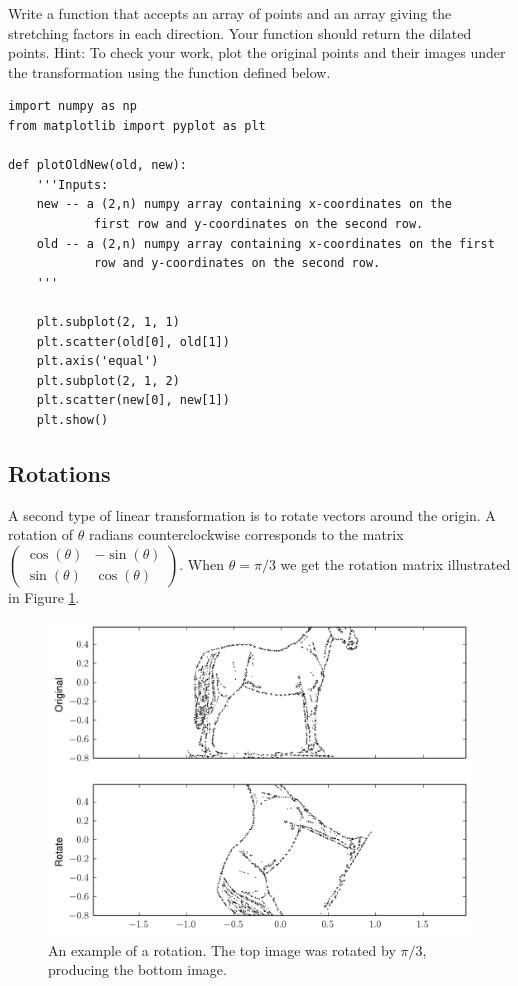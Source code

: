\begin{problem}\label{prob:dilation}
Write a function that accepts an array of points and an array giving the stretching factors in each direction. 
Your function should return the dilated points. 
Hint: To check your work, plot the original points and their images under the transformation using the function  defined below.
\begin{lstlisting}
import numpy as np
from matplotlib import pyplot as plt

def plotOldNew(old, new):
    '''Inputs:
    new -- a (2,n) numpy array containing x-coordinates on the 
            first row and y-coordinates on the second row.
    old -- a (2,n) numpy array containing x-coordinates on the first
            row and y-coordinates on the second row.
    '''
            
    plt.subplot(2, 1, 1)
    plt.scatter(old[0], old[1])
    plt.axis('equal')
    plt.subplot(2, 1, 2)
    plt.scatter(new[0], new[1])
    plt.show()
\end{lstlisting}
\end{problem}

\subsection*{Rotations}
A second type of linear transformation is to rotate vectors around the origin. 
A rotation of $\theta$ radians counterclockwise corresponds to the matrix $\begin{pmatrix}
\cos(\theta) & -\sin(\theta) \\
\sin(\theta) & \cos(\theta)
\end{pmatrix}.$ 
When $\theta = \pi/3$ we get the rotation matrix illustrated in Figure \ref{fig:rotate}.

\begin{figure}
\includegraphics[width=\textwidth]{rotate.pdf}
\caption{An example of a rotation.
The top image was rotated by $\pi/3$, producing the bottom image.}
\label{fig:rotate}
\end{figure}

